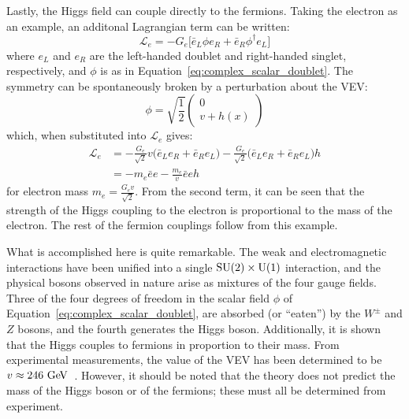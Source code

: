 Lastly, the Higgs field can couple directly to the fermions.
Taking the electron as an example, an additonal Lagrangian term can be written:
\begin{equation}
\mathcal{L}_e = -G_e \big[\bar{e}_{L}\phi e_R+\bar{e}_R\phi^{\dagger}e_L\big]
\end{equation}
where $e_L$ and $e_R$ are the left-handed doublet and right-handed singlet, respectively, and $\phi$ is as in Equation~\ref{eq:complex_scalar_doublet}.
The symmetry can be spontaneously broken by a perturbation about the VEV:
\begin{equation}
  \phi = \sqrt{\frac{1}{2}}
  \begin{pmatrix}
  0 \\ v+h(x)
  \end{pmatrix}
\end{equation}
which, when substituted into $\mathcal{L}_e$ gives:
\begin{equation}
  \begin{aligned}
    \mathcal{L}_e &= -\frac{G_e}{\sqrt{2}}v\big(\bar{e}_{L}e_{R}+\bar{e}_{R}e_{L}\big) - \frac{G_e}{\sqrt{2}}\big(\bar{e}_{L}e_{R}+\bar{e}_{R}e_{L}\big)h \\
                  &= -m_e\bar{e}e-\frac{m_e}{v}\bar{e}eh
  \end{aligned}
\end{equation}
for electron mass $m_e = \frac{G_{e}v}{\sqrt{2}}$.
From the second term, it can be seen that the strength of the Higgs coupling to the electron is proportional to the mass of the electron.
The rest of the fermion couplings follow from this example.

What is accomplished here is quite remarkable.
The weak and electromagnetic interactions have been unified into a single $\textrm{SU}(2)\times\textrm{U}(1)$ interaction, and the physical bosons observed in nature arise as mixtures of the four gauge fields.
Three of the four degrees of freedom in the scalar field $\phi$ of Equation~\ref{eq:complex_scalar_doublet}, are absorbed (or ``eaten'') by the $W^{\pm}$ and $Z$ bosons, and the fourth generates the Higgs boson.
Additionally, it is shown that the Higgs couples to fermions in proportion to their mass.
From experimental measurements, the value of the VEV has been determined to be $v\approx 246\gev$~\cite{2014.pdg}.
However, it should be noted that the theory does not predict the mass of the Higgs boson or of the fermions; these must all be determined from experiment.

